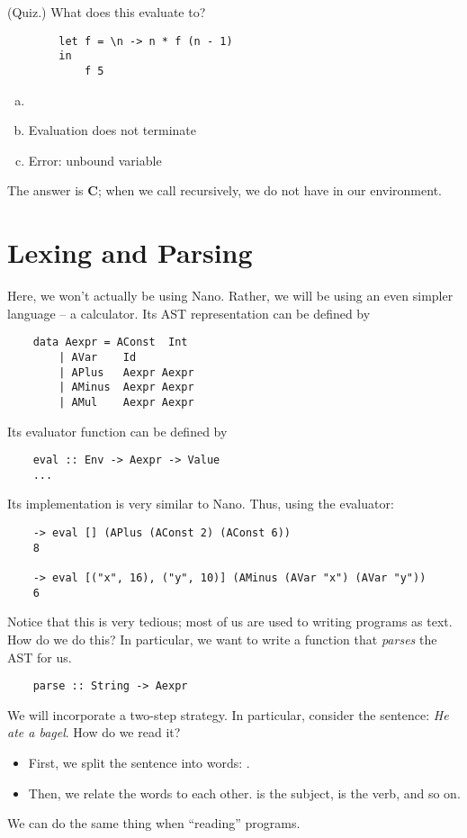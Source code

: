 \documentclass[letterpaper]{article}
\begin{document}
\begin{mdframed}[]
    (Quiz.) What does this evaluate to? 
    \begin{verbatim}
        let f = \n -> n * f (n - 1) 
        in
            f 5\end{verbatim}
    \begin{enumerate}[(a)]
        \item {}
        \item Evaluation does not terminate 
        \item Error: unbound variable 
    \end{enumerate}

    \begin{mdframed}[]
        The answer is \textbf{C}; when we call  recursively, we do not have  in our environment.
    \end{mdframed}
\end{mdframed}









\newpage 
\section{Lexing and Parsing}
Here, we won't actually be using Nano. Rather, we will be using an even simpler language -- a calculator. Its AST representation can be defined by 
\begin{verbatim}
    data Aexpr = AConst  Int
        | AVar    Id
        | APlus   Aexpr Aexpr
        | AMinus  Aexpr Aexpr
        | AMul    Aexpr Aexpr\end{verbatim}
Its evaluator function can be defined by 
\begin{verbatim}
    eval :: Env -> Aexpr -> Value
    ...\end{verbatim}
Its implementation is very similar to Nano. Thus, using the evaluator:
\begin{verbatim}
    -> eval [] (APlus (AConst 2) (AConst 6))
    8

    -> eval [("x", 16), ("y", 10)] (AMinus (AVar "x") (AVar "y"))
    6\end{verbatim}
Notice that this is very tedious; most of us are used to writing programs as text. How do we do this? In particular, we want to write a function that \emph{parses} the AST for us. 
\begin{verbatim}
    parse :: String -> Aexpr \end{verbatim}
We will incorporate a two-step strategy. In particular, consider the sentence: \emph{He ate a bagel}. How do we read it? 
\begin{itemize}
    \item First, we split the sentence into words: .
    \item Then, we relate the words to each other.  is the subject,  is the verb, and so on. 
\end{itemize}
We can do the same thing when ``reading'' programs. 
\end{document}
